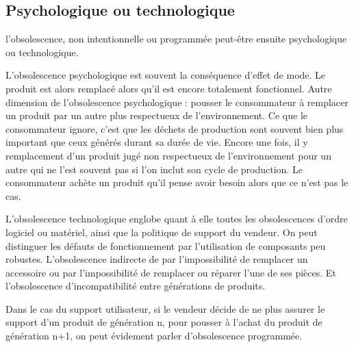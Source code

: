 \subsection{Psychologique ou technologique}

l’obsolescence, non intentionnelle ou programmée peut-être ensuite psychologique ou technologique. 

L’obsolescence psychologique est souvent la conséquence d’effet de mode. Le produit est alors remplacé alors qu’il est encore totalement fonctionnel. Autre dimension de l’obsolescence psychologique : pousser le consommateur à remplacer un produit par un autre plus respectueux de l’environnement. Ce que le consommateur ignore, c’est que les déchets de production sont souvent bien plus important que ceux générés durant sa durée de vie. Encore une fois, il y remplacement d’un produit jugé non respectueux de l’environnement pour un autre qui ne l’est souvent pas si l’on inclut son cycle de production. Le consommateur achète un produit qu'il pense avoir besoin alors que ce n'est pas le cas.

L’obsolescence technologique englobe quant à elle toutes les obsolescences d’ordre logiciel ou matériel, ainsi que la politique de support du vendeur. On peut distinguer les défauts de fonctionnement par l’utilisation de composants peu robustes. L’obsolescence indirecte de par l'impossibilité de remplacer un accessoire ou par l’impossibilité de remplacer ou réparer l’une de ses pièces. Et l’obsolescence d’incompatibilité entre générations de produits.

Dans le cas du support utilisateur, si le vendeur décide de ne plus assurer le support d’un produit de génération n, pour pousser à l’achat du produit de génération n+1, on peut évidement parler d'obsolescence programmée.  